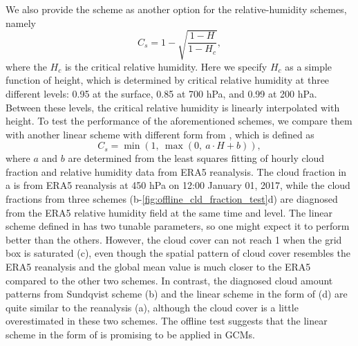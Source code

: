 We also provide the \citet{Sundqvist1989} scheme as another option for the relative-humidity schemes, namely
\begin{equation}
	C_s = 1-\sqrt{\frac{1-H}{1-H_{c}}},
	\label{eq:sundqvist}
\end{equation}
where the $H_{c}$ is the critical relative humidity. Here we specify $H_{c}$ as a simple function of height, which is determined by critical relative humidity at three different levels: 0.95 at the surface, 0.85 at 700 hPa, and 0.99 at 200 hPa. Between these levels, the critical relative humidity is linearly interpolated with height. To test the performance of the aforementioned schemes, we compare them with another linear scheme with different form from , which is defined as
\begin{equation}
	C_s = \min\left(1, ~\max \left(0, ~ a \cdot H + b \right)\right),
	\label{eq:linear2}
\end{equation}
where $a$ and $b$ are determined from the least squares fitting of hourly cloud fraction and relative humidity data from ERA5 reanalysis. The cloud fraction in a is from ERA5 reanalysis at 450 hPa on 12:00 January 01, 2017, while the cloud fractions from three schemes (b-\ref{fig:offline_cld_fraction_test}d) are diagnosed from the ERA5 relative humidity field at the same time and level. The linear scheme defined in  has two tunable parameters, so one might expect it to perform better than the others. However, the cloud cover can not reach 1 when the grid box is saturated (c), even though the spatial pattern of cloud cover resembles the ERA5 reanalysis and the global mean value is much closer to the ERA5 compared to the other two schemes. In contrast, the diagnosed cloud amount patterns from Sundqvist scheme (b) and the linear scheme in the form of  (d) are quite similar to the reanalysis (a), although the cloud cover is a little overestimated in these two schemes. The offline test suggests that the linear scheme in the form of  is promising to be applied in GCMs.

